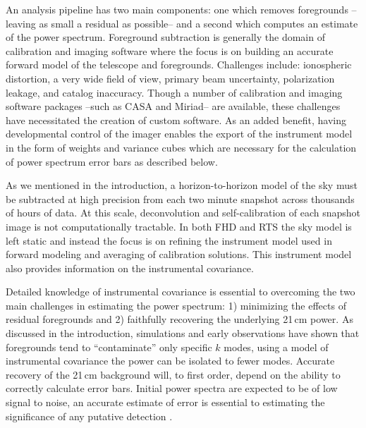 \documentclass[twolcolumn,iop]{emulateapj}
\begin{document}
An analysis pipeline has two main components: one which removes foregrounds --leaving as small a residual as possible-- and a second which computes an estimate of the power spectrum.   Foreground subtraction is generally the domain of calibration and imaging software where the focus is on building an accurate forward model of the telescope and foregrounds.  Challenges include: ionospheric distortion, a very wide field of view, primary beam uncertainty, polarization leakage, and catalog inaccuracy. Though a number of calibration and imaging software packages --such as CASA and Miriad-- are available, these challenges have necessitated the creation of custom software.  As an added benefit, having developmental control of the imager enables the export of the instrument model in the form of weights and variance cubes which are necessary for the calculation of power spectrum error bars as described below. 

As we mentioned in the introduction, a horizon-to-horizon model of the sky must be subtracted at high precision from each two minute snapshot across thousands of hours of data. At this scale, deconvolution and self-calibration of each snapshot image is not computationally tractable.  In both FHD and RTS the sky model is left static and instead the focus is on refining the instrument model used in forward modeling and averaging of calibration solutions.  This instrument model also provides information on the instrumental covariance.


Detailed knowledge of instrumental covariance is essential to overcoming the two main challenges in estimating the power spectrum: 1) minimizing the effects of residual foregrounds and 2) faithfully recovering the underlying 21\,cm power.   As discussed in the introduction, simulations and early observations have shown that foregrounds tend to ``contaminate'' only specific $k$ modes, using a model of instrumental covariance the power can be isolated to fewer modes.  Accurate recovery of the 21\,cm background will, to first order, depend on the ability to correctly calculate error bars.  Initial power spectra are expected to be of low signal to noise, an accurate estimate of error is essential to estimating the significance of any putative detection \citep{Pober:2014p10390,Beardsley:2013p9952}. 
\end{document}
